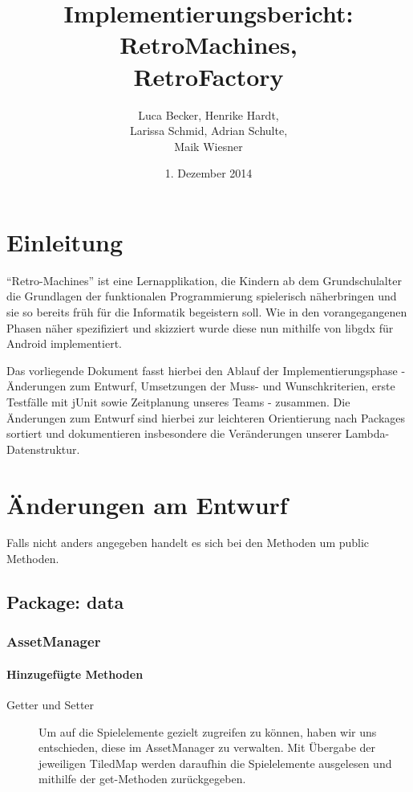 \documentclass[parskip=full]{scrreprt}
\begin{document}
\title{Implementierungsbericht: RetroMachines, \\ RetroFactory}
\author{Luca Becker, Henrike Hardt,\\Larissa Schmid, Adrian Schulte,\\Maik Wiesner}
\date{1. Dezember 2014}
\maketitle
\thispagestyle{empty}

\clearpage

\thispagestyle{empty}
\tableofcontents
\thispagestyle{empty}

\clearpage
\setcounter{page}{1}

\chapter{Einleitung}

"`Retro-Machines"' ist eine Lernapplikation, die Kindern ab dem Grundschulalter die Grundlagen der funktionalen Programmierung spielerisch näherbringen und sie so bereits früh für die Informatik begeistern soll. Wie in den vorangegangenen Phasen näher spezifiziert und skizziert wurde diese nun mithilfe von libgdx für Android implementiert.

Das vorliegende Dokument fasst hierbei den Ablauf der Implementierungsphase - Änderungen zum Entwurf, Umsetzungen der Muss- und Wunschkriterien, erste Testfälle mit jUnit sowie Zeitplanung unseres Teams - zusammen. Die Änderungen zum Entwurf sind hierbei zur leichteren Orientierung nach Packages sortiert und dokumentieren insbesondere die Veränderungen unserer Lambda-Datenstruktur.

\chapter{Änderungen am Entwurf}

Falls nicht anders angegeben handelt es sich bei den Methoden um public Methoden.

\section{Package: data}

\subsection{AssetManager}

\subsubsection{Hinzugefügte Methoden}
\begin{description}
	\item[Getter und Setter] Um auf die Spielelemente gezielt zugreifen zu können, haben wir uns entschieden, diese im AssetManager zu verwalten. Mit Übergabe der jeweiligen TiledMap werden daraufhin die Spielelemente ausgelesen und mithilfe der get-Methoden zurückgegeben.
\end{description}
\end{document}
